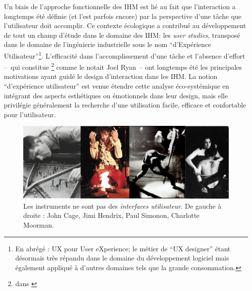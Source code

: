 \noindent Un biais de l'approche fonctionnelle des \gls{IHM} est lié au fait que l'interaction a longtemps été définie (et l'est parfois encore) par la perspective d'une tâche que l'utilisateur doit accomplir. Ce contexte écologique a contribué au développement de tout un champ d'étude dans le domaine des \gls{IHM}: les \textit{user studies}, transposé dans le domaine de l'ingénierie industrielle sous le nom ``d'Expérience Utilisateur''\footnote{En abrégé : UX pour User eXperience; le métier de ``UX designer'' étant désormais très répandu dans le domaine du développement logiciel mais également appliqué à d'autres domaines tels que la grande consommation.}. L'efficacité dans l'accomplissement d'une tâche et l'absence d'effort --~qui constitue \footnote{ dans \cite{ryan_remarks_1991}} comme le notait Joel Ryan~-- ont longtemps été les principales motivations ayant guidé le design d'interaction dans les \gls{IHM}. La notion ``d'expérience utilisateur'' est venue étendre cette analyse éco-systémique en intégrant des aspects esthétiques ou émotionnels dans leur design, mais elle privilégie généralement la recherche d'une utilisation facile, efficace et confortable pour l'utilisateur.\\
\begin{figure}[!htbp]
	\captionsetup{format=plain}%
	\includegraphics[width=\textwidth]{gfx/03_gesture/instrumentabusers.png}
	\caption[Les instruments ne sont pas des interfaces utilisateur]{Les instruments ne sont pas des \textit{interfaces utilisateur}. De gauche à droite : John Cage, Jimi Hendrix, Paul Simonon, Charlotte Moorman.}
	\label{fig:gesture:abusers}
\end{figure}
